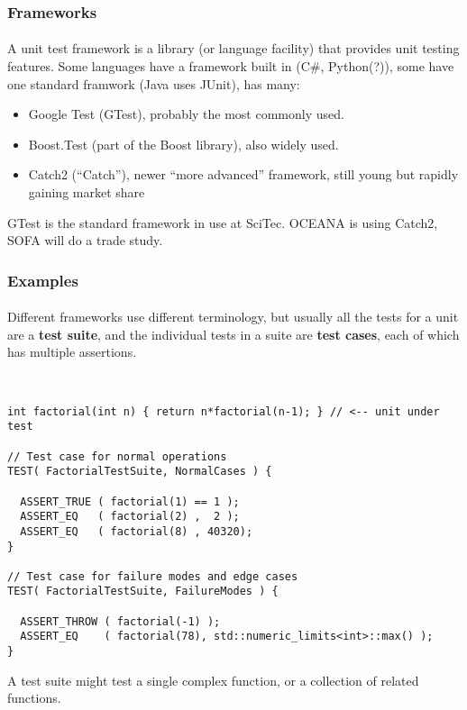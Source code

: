 \begin{frame}[fragile]
\frametitle{Frameworks}
\framesubtitle{}
A unit test framework is a library (or language facility) that
provides unit testing features. Some languages have a framework built
in (C\#, Python(?)), some have one standard framwork (Java uses
JUnit), \CC has many:
\begin{itemize}
\item Google Test (GTest), probably the most commonly used.
\item Boost.Test (part of the Boost library), also widely used.
\item Catch2 (``Catch''), newer ``more advanced'' framework, still
  young but rapidly gaining market share
\end{itemize}
\vskip 6pt
GTest is the standard framework in use at SciTec.  OCEANA is using
Catch2, SOFA will do a trade study.
\vskip 6pt
\begin{center}
\end{center}

\end{frame}



\begin{frame}[fragile]
\frametitle{Examples}
\framesubtitle{}
Different frameworks use different terminology, but usually all the
tests for a unit are a {\bf test suite}, and the individual tests in a
suite are {\bf test cases}, each of which has multiple assertions.

{\scriptsize\
\begin{verbatim}
int factorial(int n) { return n*factorial(n-1); } // <-- unit under test

// Test case for normal operations
TEST( FactorialTestSuite, NormalCases ) {  

  ASSERT_TRUE ( factorial(1) == 1 );  
  ASSERT_EQ   ( factorial(2) ,  2 );  
  ASSERT_EQ   ( factorial(8) , 40320);
}

// Test case for failure modes and edge cases
TEST( FactorialTestSuite, FailureModes ) {

  ASSERT_THROW ( factorial(-1) );
  ASSERT_EQ    ( factorial(78), std::numeric_limits<int>::max() );
}
\end{verbatim}}

A test suite might test a single complex function, or a collection of
related functions.

\end{frame}

